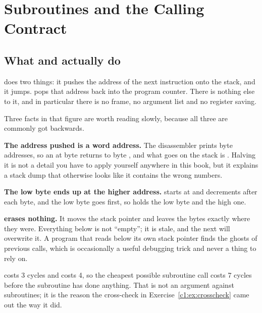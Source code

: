 
\section{Subroutines and the Calling Contract}
\label{c2:sec:subroutines}

\subsection{What  and  actually do}
\label{c2:sec:rcall}
 does two things: it pushes the address of the next instruction onto the stack, and it
jumps.  pops that address back into the program counter. There is nothing else to it,
and in particular there is no frame, no argument list and no register saving.


Three facts in that figure are worth reading slowly, because all three are commonly got backwards.

\textbf{The address pushed is a word address.} The disassembler prints byte addresses, so an
 at byte  returns to byte , and what goes on the stack is
. Halving it is not a detail you have to apply yourself anywhere in this book, but it
explains a stack dump that otherwise looks like it contains the wrong numbers.

\textbf{The low byte ends up at the higher address.}  starts at  and
decrements after each byte, and the low byte goes first, so  holds the low byte and
 the high one.

\textbf{ erases nothing.} It moves the stack pointer and leaves the bytes exactly where
they were. Everything below  is not ``empty''; it is stale, and the next  will
overwrite it. A program that reads below its own stack pointer finds the ghosts of previous calls,
which is occasionally a useful debugging trick and never a thing to rely on.

 costs 3 cycles and  costs 4, so the cheapest possible subroutine call costs
7 cycles before the subroutine has done anything. That is not an argument against subroutines; it
is the reason the cross-check in Exercise~\ref{c1:ex:crosscheck} came out the way it did.

